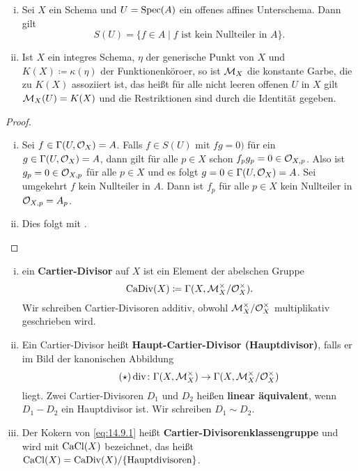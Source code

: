 \begin{bem}
\label{bem:14.8}
	\begin{enumerate}[i)]
		\item\label{bem:14.8:i} Sei $X$ ein Schema und $U=\operatorname{Spec}(A)$ ein offenes affines Unterschema. Dann gilt
		\[
			S(U) = \{f \in A \mid f \text{ ist kein Nullteiler in }A\}.
		\]
		\item\label{bem:14.8:ii} Ist $X$ ein integres Schema, $\eta$ der generische Punkt von $X$ und $K(X) \coloneqq \kappa(\eta)$ der Funktionenköroer, so ist $\mathcal{M}_X$ die konstante Garbe, die zu $K(X)$ assoziiert ist, das heißt für alle nicht leeren offenen $U$ in $X$ gilt $\mathcal{M}_X(U) = K(X)$ und die Restriktionen sind durch die Identität gegeben.
	\end{enumerate}
	\begin{proof}
		\begin{enumerate}[i)]
			\item Sei $f\in \Gamma(U,\mathcal{O}_X) = A$. Falls $f\in S(U)$ mit $fg = 0)$ für ein $g\in \Gamma(U,\mathcal{O}_X) = A$, dann gilt für alle $p \in X$ schon $f_p g_p = 0 \in \mathcal{O}_{X,p}$. Also ist $g_p = 0 \in \mathcal{O}_{X,p}$ für alle $p \in X$ und es folgt $g = 0\in \Gamma(U,\mathcal{O}_X) = A$. Sei umgekehrt $f$ kein Nullteiler in $A$. Dann ist $f_p$ für alle $p \in X$ kein Nullteiler in $\mathcal{O}_{X,p} = A_p$.
			\item Dies folgt mit \cite[{}3.29]{goertz2010algebraic}.
		\end{enumerate}
	\end{proof}
\end{bem}

\begin{defn}
\label{defn:14.9}
	\begin{enumerate}[i)]
		\item ein \textbf{Cartier-Divisor} auf $X$ ist ein Element der abelschen Gruppe
		\[
			\operatorname{CaDiv}(X) \coloneqq \Gamma(X,\mathcal{M}_X^\times/\mathcal{O}_X^\times).
		\]
		Wir schreiben Cartier-Divisoren additiv, obwohl $\mathcal{M}_X^\times/\mathcal{O}_X^\times$ multiplikativ geschrieben wird.
		\item Ein Cartier-Divisor heißt \textbf{Haupt-Cartier-Divisor (Hauptdivisor)}, falls er im Bild der kanonischen Abbildung
		\[\label{eq:14.9.1}\tag{$\star$}
			\operatorname{div}\colon \Gamma(X,\mathcal{M}_X^\times) \to \Gamma(X,\mathcal{M}_X^\times/\mathcal{O}_X^\times)
		\]
		liegt. Zwei Cartier-Divisoren $D_1$ und $D_2$ heißen \textbf{linear äquivalent}, wenn $D_1 - D_2$ ein Hauptdivisor ist. Wir schreiben $D_1 \sim D_2$.
		\item Der Kokern von \eqref{eq:14.9.1} heißt \textbf{Cartier-Divisorenklassengruppe} und wird mit $\operatorname{CaCl}(X)$ bezeichnet, das heißt $\operatorname{CaCl}(X) = \operatorname{CaDiv}(X)/\{\text{Hauptdivisoren}\}$.
	\end{enumerate}
\end{defn}

